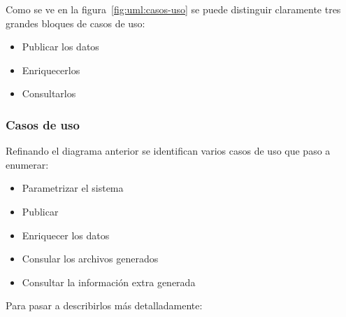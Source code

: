 Como se ve en la figura~\ref{fig:uml:casos-uso} se puede distinguir claramente
tres grandes bloques de casos de uso:

\begin{itemize}
 \item Publicar los datos
 \item Enriquecerlos
 \item Consultarlos
\end{itemize}

\subsubsection{Casos de uso}\label{sec:casos-uso}

Refinando el diagrama anterior se identifican varios casos de uso que paso a
enumerar:

\begin{itemize}
 \item Parametrizar el sistema
 \item Publicar
 \item Enriquecer los datos
 \item Consular los archivos generados
 \item Consultar la información extra generada
\end{itemize}

Para pasar a describirlos más detalladamente:


